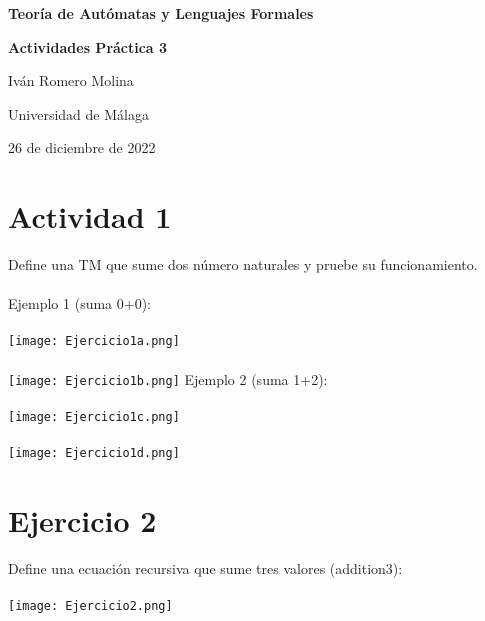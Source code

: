 \documentclass[16]{article} %
\begin{document}
\begin{titlepage} %
	\centering  %
	{\bfseries\Huge Teoría de Autómatas y Lenguajes Formales\par}
   	\vspace{2cm} %
    {\bfseries\huge Actividades Práctica 3\par}
    \vfill %
    {\huge Iván Romero Molina\par}
    \vspace{1cm}
    {\Large Universidad de Málaga\par}
    \vspace{1cm}
    {\large 26 de diciembre de 2022\par}
\end{titlepage}
    
\newpage
\section*{Actividad 1}	%
\noindent
Define una TM que sume dos número naturales y pruebe su funcionamiento.\\\\
Ejemplo 1 (suma 0+0):\\\\
\texttt{[image: Ejercicio1a.png]}\\\\
\texttt{[image: Ejercicio1b.png]}
\newpage
\noindent
Ejemplo 2 (suma 1+2):\\\\
\texttt{[image: Ejercicio1c.png]}\\\\
\texttt{[image: Ejercicio1d.png]}

\newpage
\section*{Ejercicio 2}
\noindent
Define una ecuación recursiva que sume tres valores (addition3):
\\\\
\texttt{[image: Ejercicio2.png]}

\newpage
\end{document}
